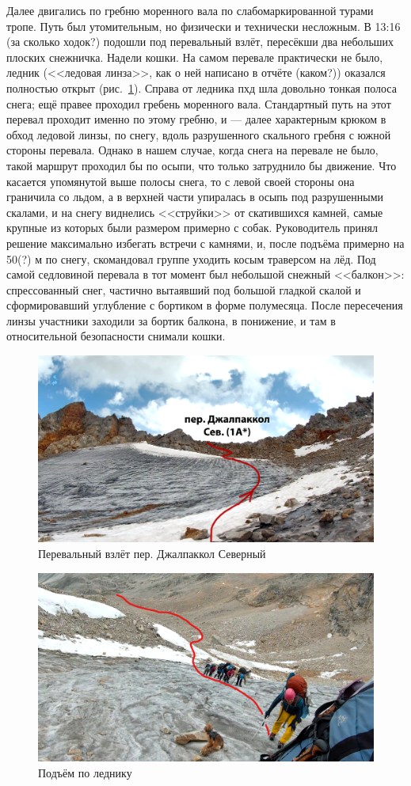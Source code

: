 Далее двигались по гребню моренного вала по слабомаркированной турами тропе. Путь был утомительным, но физически и технически несложным. В 13:16 \alert{(за сколько ходок?)} подошли под перевальный взлёт, пересёкши два небольших плоских снежничка. Надели кошки. На самом перевале практически не было, ледник (<<ледовая линза>>, как о ней написано в отчёте \alert{(каком?)}) оказался полностью открыт (рис.~\ref{fig:dzh_1}). Справа от ледника пхд шла довольно тонкая полоса снега; ещё правее проходил гребень моренного вала. Стандартный путь на этот перевал проходит именно по этому гребню, и --- далее характерным крюком в обход ледовой линзы, по снегу, вдоль разрушенного скального гребня с южной стороны перевала. Однако в нашем случае, когда снега на перевале не было, такой маршрут проходил бы по осыпи, что только затруднило бы движение. Что касается упомянутой выше полосы снега, то с левой своей стороны она граничила со льдом, а в верхней части упиралась в осыпь под разрушенными скалами, и на снегу виднелись <<струйки>> от скатившихся камней, самые крупные из которых были размером примерно с собак. Руководитель принял решение максимально избегать встречи с камнями, и, после подъёма примерно на 50\alert{(?)} м по снегу, скомандовал группе уходить косым траверсом на лёд. Под самой седловиной перевала в тот момент был небольшой снежный <<балкон>>: спрессованный снег, частично вытаявший под большой гладкой скалой и сформировавший углубление с бортиком в форме полумесяца. После пересечения линзы участники заходили за бортик балкона, в понижение, и там в относительной безопасности снимали кошки.
 



\begin{figure}[h!]
	\centering
	\includegraphics[width=0.7\linewidth]{../pics/dzh_1}
	\caption{Перевальный взлёт пер. Джалпаккол Северный}
	\label{fig:dzh_1}
\end{figure}

\begin{figure}[h!]	
	\centering
	\includegraphics[angle=0, width=0.7\linewidth]{../pics/gopro_dzh}
	\caption{Подъём по леднику}
	\label{fig:gopro_dzh}
\end{figure}

